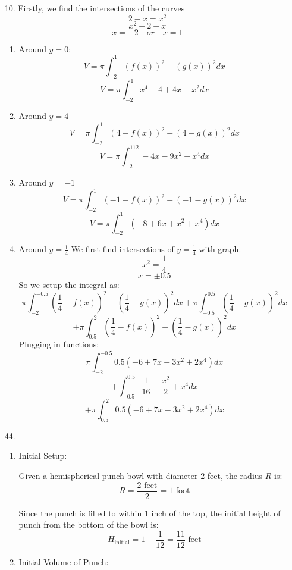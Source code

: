 \documentclass[12pt]{article}
\begin{document}
\begin{enumerate}[start=1,label={\bfseries. },leftmargin=1in]
  \item [10. ]
  Firstly, we find the intersections of the curves
  \[
  2-x = x^2
  \]
  \[
  x^2 -2 +x
  \]
  \[
  x=-2 \quad or \quad x=1
  \]
     \begin{enumerate}
       \item Around $y=0$:
       \[
       V = \pi\int_{-2}^1 (f(x))^2 - (g(x))^2dx
       \]
       \[
       V = \pi\int_{-2}^1 x^4 - 4 + 4x - x^2 dx
       \]
       \item Around $y=4$
       \[
       V = \pi\int_{-2}^1 (4-f(x))^2 - (4-g(x))^2dx
       \]
       \[
       V = \pi\int_{-2}^112 - 4 x - 9 x^2 + x^4dx
       \]
       \item Around $y = -1$
       \[
       V = \pi\int_{-2}^1 (-1-f(x))^2 - (-1-g(x))^2dx
       \]
       \[
       V = \pi\int_{-2}^1(-8 + 6 x + x^2 + x^4)dx
       \]
       \item Around $y=\frac{1}{4}$
       We first find intersections of $y=\frac{1}{4}$ with graph. 
       \[
       x^2 = \frac{1}{4}
       \]
       \[
       x = \pm 0.5
       \]
       So we setup the integral as:
       \[
       \pi\int_{-2}^{-0.5} \left(\frac{1}{4}-f(x)\right)^2 - \left(\frac{1}{4}-g(x)\right)^2 dx + \pi\int_{-0.5}^{0.5}\left(\frac{1}{4} - g(x)\right)^2dx
       \]
       \[
       +\pi\int_{0.5}^{2} \left(\frac{1}{4}-f(x)\right)^2 - \left(\frac{1}{4}-g(x)\right)^2 dx
       \]
       Plugging in functions:
       \[
       \pi\int_{-2}^{-0.5}0.5 (-6 + 7 x - 3 x^2 + 2 x^4)dx
       \]
       \[
       + \int_{-0.5}^{0.5}\frac{1}{16} - \frac{x^2}{2} + x^4 dx
       \]
       \[
       +\pi\int_{0.5}^{2}0.5 (-6 + 7 x - 3 x^2 + 2 x^4)dx
       \]
     \end{enumerate}

    \item [44. ]
    \begin{enumerate}

        \item Initial Setup:
        
        Given a hemispherical punch bowl with diameter 2 feet, the radius \( R \) is:
        \[
        R = \frac{2 \text{ feet}}{2} = 1 \text{ foot}
        \]
        
        Since the punch is filled to within 1 inch of the top, the initial height of punch from the bottom of the bowl is:
        \[
        H_{\text{initial}} = 1 - \frac{1}{12} = \frac{11}{12} \text{ feet}
        \]
        
        \item Initial Volume of Punch:
        

\end{enumerate}
\end{enumerate}
\end{document}
